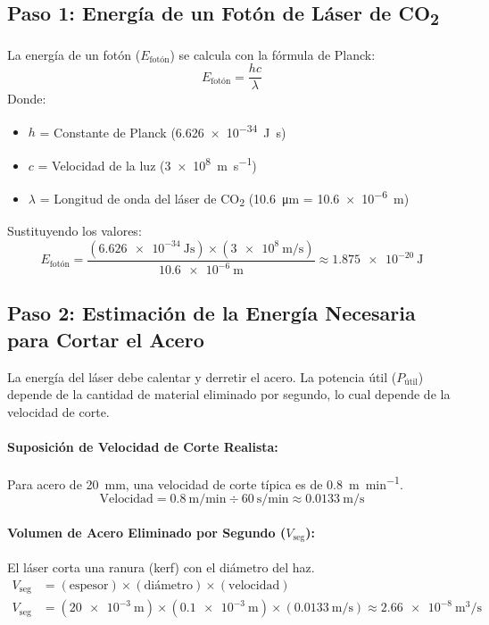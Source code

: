 \documentclass[11pt,a4paper]{book}
\begin{document}
\subsection*{Paso 1: Energía de un Fotón de Láser de CO\textsubscript{2}}
La energía de un fotón ($E_{\text{fotón}}$) se calcula con la fórmula de Planck:
\[ E_{\text{fotón}} = \frac{hc}{\lambda} \]
Donde:
\begin{itemize}
    \item $h$ = Constante de Planck (\SI{6.626e-34}{\joule\second})
    \item $c$ = Velocidad de la luz (\SI{3e8}{\meter\per\second})
    \item $\lambda$ = Longitud de onda del láser de CO\textsubscript{2} (\SI{10.6}{\micro\meter} = \SI{10.6e-6}{\meter})
\end{itemize}
Sustituyendo los valores:
\[ E_{\text{fotón}} = \frac{(\SI{6.626e-34}{\joule\second}) \times (\SI{3e8}{\meter\per\second})}{\SI{10.6e-6}{\meter}} \approx \SI{1.875e-20}{\joule} \]

\subsection*{Paso 2: Estimación de la Energía Necesaria para Cortar el Acero}
La energía del láser debe calentar y derretir el acero. La potencia útil ($P_{\text{útil}}$) depende de la cantidad de material eliminado por segundo, lo cual depende de la velocidad de corte.

\paragraph{Suposición de Velocidad de Corte Realista:} Para acero de \SI{20}{\milli\meter}, una velocidad de corte típica es de \SI{0.8}{\meter\per\minute}.
\[ \text{Velocidad} = \SI{0.8}{\meter\per\minute} \div \SI{60}{\second\per\minute} \approx \SI{0.0133}{\meter\per\second} \]

\paragraph{Volumen de Acero Eliminado por Segundo ($V_{\text{seg}}$):}
El láser corta una ranura (kerf) con el diámetro del haz.
\begin{align*}
    V_{\text{seg}} &= (\text{espesor}) \times (\text{diámetro}) \times (\text{velocidad}) \\
    V_{\text{seg}} &= (\SI{20e-3}{\meter}) \times (\SI{0.1e-3}{\meter}) \times (\SI{0.0133}{\meter\per\second}) \approx \SI{2.66e-8}{\meter^3\per\second}
\end{align*}
\end{document}
